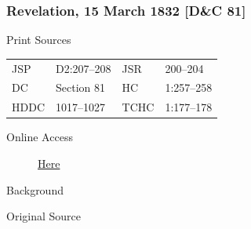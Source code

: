 		\subsubsection{Revelation, 15 March 1832 [D\&C 81]}
			\label{EMS-1832-JS-15-MAR-1832}
		
			\begin{description}
				\item[Print Sources]
			\end{description}

				\begin{tabular}{p{0.5in}p{1in}p{0.5in}p{1in}}
				JSP	 	& D2:207--208	& JSR 		& 200--204 \\
				DC	 	& Section 81 	& HC 		& 1:257--258 \\
				HDDC 	& 1017--1027	& TCHC 		& 1:177--178 \\
				\end{tabular}
			
			\begin{description}
				\item[Online Access] \href{https://www.josephsmithpapers.org/paper-summary/revelation-15-march-1832-dc-81/1}{Here}
			\end{description}
			
			\begin{description}
				\item[Background]
			\end{description}
			
			
			\begin{description}
				\item[Original Source]
			\end{description}
			
			
